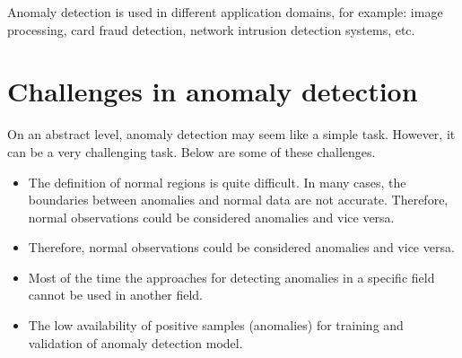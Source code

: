 Anomaly detection is used in different application domains, for example: image processing, card fraud detection, network intrusion detection systems, etc.

\section{Challenges in anomaly detection}

On an abstract level, anomaly detection may seem like a simple task. However, it can be a very challenging task. Below are some of these challenges.

\begin{itemize}
\item The definition of normal regions is quite difficult. In many cases, the boundaries between anomalies and normal data are not accurate. Therefore, normal observations could be considered anomalies and vice versa.

\item Therefore, normal observations could be considered anomalies and vice versa.

\item Most of the time the approaches for detecting anomalies in a specific field cannot be used in another field.

\item The low availability of positive samples (anomalies) for training and validation of anomaly detection model.

\end{itemize}

